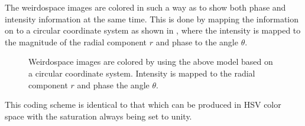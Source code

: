 The weirdospace images are colored in such a way as to show both phase and
intensity information at the same time.  This is done by mapping the
information on to a circular coordinate system as shown in , where the intensity is mapped to the magnitude of the radial
component $r$ and phase to the angle $\theta$.  
\begin{figure}
\centering
\caption{Weirdospace images are colored by using the above model based on a
circular coordinate system.  Intensity is mapped to the radial component
$r$ and phase the angle $\theta$.}
\label{fig:hsv}
\end{figure}
This coding scheme is identical to that which can be produced in HSV color
space with the saturation always being set to unity.

